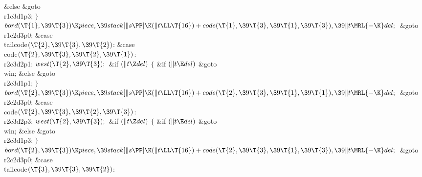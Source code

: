 \2\&{else}\1\5
\&{goto} \\{r1c3d1p3};\5
\2${}\}{}$\2\6
${}\\{bord}(\T{1},\39\T{3})\K\\{piece},\39\\{stack}[\|s\PP]\K(\|t\LL\T{16})+%
\\{code}(\T{1},\39\T{3},\39\T{1},\39\T{3}),\39\|t\MRL{-{\K}}\\{del};{}$\6
\&{goto} \\{r1c2d3p0};\6
\4\&{case} \\{tailcode}${}(\T{2},\39\T{3},\39\T{2}){}$:\5
\&{case} \\{code}${}(\T{2},\39\T{3},\39\T{2},\39\T{1}){}$:\5
\\{r2c3d2p1}:\5
${}\\{west}(\T{2},\39\T{3});{}$\6
\&{if} ${}(\|t\Z\\{del}){}$\5
${}\{{}$\5
\1\&{if} ${}(\|t\E\\{del}){}$\1\5
\&{goto} \\{win};\5
\2\&{else}\1\5
\&{goto} \\{r2c3d1p1};\5
\2${}\}{}$\2\6
${}\\{bord}(\T{2},\39\T{3})\K\\{piece},\39\\{stack}[\|s\PP]\K(\|t\LL\T{16})+%
\\{code}(\T{2},\39\T{3},\39\T{1},\39\T{1}),\39\|t\MRL{-{\K}}\\{del};{}$\6
\&{goto} \\{r2c2d3p0};\6
\4\&{case} \\{code}${}(\T{2},\39\T{3},\39\T{2},\39\T{3}){}$:\5
\\{r2c3d2p3}:\5
${}\\{west}(\T{2},\39\T{3});{}$\6
\&{if} ${}(\|t\Z\\{del}){}$\5
${}\{{}$\5
\1\&{if} ${}(\|t\E\\{del}){}$\1\5
\&{goto} \\{win};\5
\2\&{else}\1\5
\&{goto} \\{r2c3d1p3};\5
\2${}\}{}$\2\6
${}\\{bord}(\T{2},\39\T{3})\K\\{piece},\39\\{stack}[\|s\PP]\K(\|t\LL\T{16})+%
\\{code}(\T{2},\39\T{3},\39\T{1},\39\T{3}),\39\|t\MRL{-{\K}}\\{del};{}$\6
\&{goto} \\{r2c2d3p0};\6
\4\&{case} \\{tailcode}${}(\T{3},\39\T{3},\39\T{2}){}$:\5
